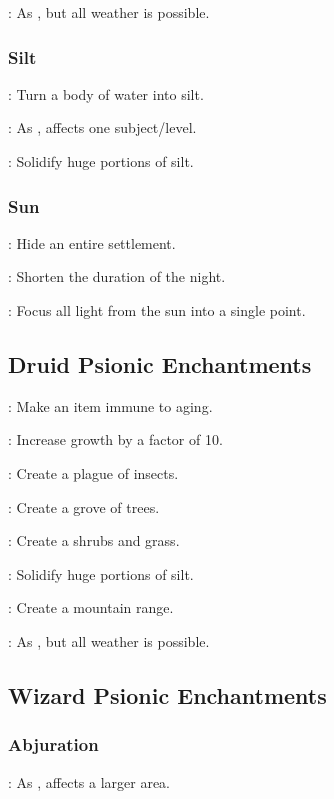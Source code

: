 : As , but all weather is possible.


\subsubsection{Silt}
: Turn a body of water into silt. %

: As , affects one subject/level. %

: Solidify huge portions of silt.


\subsubsection{Sun}
: Hide an entire settlement. %

: Shorten the duration of the night. %

: Focus all light from the sun into a single point. %


\subsection{Druid Psionic Enchantments}
: Make an item immune to aging.

: Increase growth by a factor of 10.

: Create a plague of insects.

: Create a grove of trees.

: Create a shrubs and grass.

: Solidify huge portions of silt.

: Create a mountain range.

: As , but all weather is possible.



\subsection{Wizard Psionic Enchantments}
\subsubsection{Abjuration}
: As , affects a larger area.

